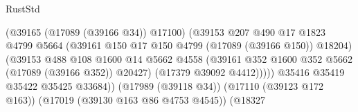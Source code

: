 \begin{lexlean}{RustStd}
\begin{coremodule}
                                                        (@39165 (@17089 (@39166 @34)) @17100)
                                                        (@39153
                                                          @207
                                                          @490
                                                          @17
                                                          @1823
                                                          @4799
                                                          @5664
                                                          (@39161
                                                            @150
                                                            @17
                                                            @150
                                                            @4799
                                                            (@17089 (@39166 @150))
                                                            @18204)
                                                          (@39153
                                                            @488
                                                            @108
                                                            @1600
                                                            @14
                                                            @5662
                                                            @4558
                                                            (@39161
                                                              @352
                                                              @1600
                                                              @352
                                                              @5662
                                                              (@17089 (@39166 @352))
                                                              @20427)
                                                            (@17379 @39092 @4412)))))
                                                    @35416
                                                    @35419
                                                    @35422
                                                    @35425
                                                    @33684))
                                                (@17989 (@39118 @34))
                                                (@17110 (@39123 @172 @163))
                                                (@17019 (@39130 @163 @86 @4753 @4545))
                                                (@18327

\end{coremodule}
\end{lexlean}

